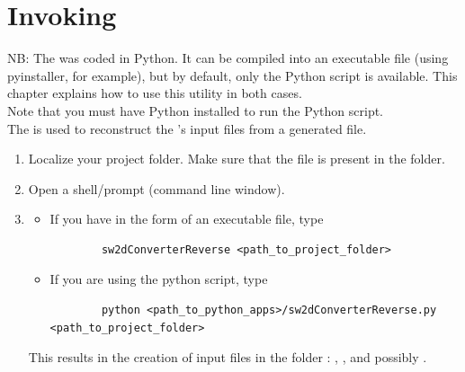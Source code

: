 \section{Invoking \swConverterReverse}

NB: The \swConverterReverse was coded in Python. It can be compiled into an executable file (using pyinstaller, for example), but by default, only the Python script is available. This chapter explains how to use this utility in both cases. \\
Note that you must have Python installed to run the Python script. \\

The \swConverterReverse is used to reconstruct the \swConverter's input files from a generated  file.

\begin{enumerate}
	\item Localize your project folder. Make sure that the  file is present in the  folder.
	\item Open a shell/prompt (command line window).
	\item \begin{itemize}
		\item If you have \swConverterReverse in the form of an executable file, type
		\begin{small}\begin{verbatim}
		sw2dConverterReverse <path_to_project_folder>
		\end{verbatim}\end{small}
		\item If you are using the python script, type
		\begin{small}\begin{verbatim}
		python <path_to_python_apps>/sw2dConverterReverse.py <path_to_project_folder>
		\end{verbatim}\end{small}
	\end{itemize}
	This results in the creation of \swConverter input files in the  folder : , , and possibly .
\end{enumerate}
